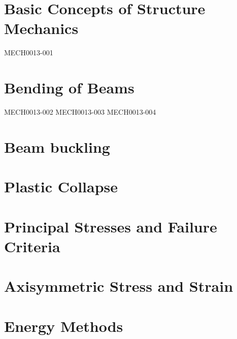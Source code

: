 \documentclass[12pt]{report}
\numberwithin{equation}{section}
\begin{document}
\chapter{Basic Concepts of Structure Mechanics}
{MECH0013-001}
\chapter{Bending of Beams}
{MECH0013-002}
{MECH0013-003}
{MECH0013-004}

\chapter{Beam buckling}
\chapter{Plastic Collapse}
\chapter{Principal Stresses and Failure Criteria}
\chapter{Axisymmetric Stress and Strain}
\chapter{Energy Methods}
\end{document}
